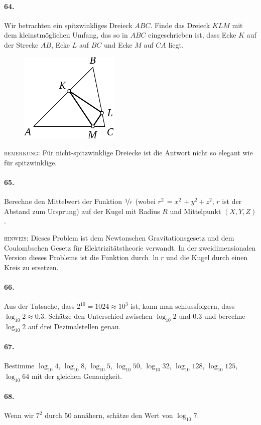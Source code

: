 \documentclass[10pt,a5paper,twoside]{article}
\newenvironment{problem}[1]{\paragraph*{#1}}{}
\begin{document}
\begin{problem}{64.}
	Wir betrachten ein spitzwinkliges Dreieck $ABC$. Finde das Dreieck $KLM$ mit dem kleinstmöglichen Umfang, das so in $ABC$ eingeschrieben ist, dass Ecke $K$ auf der Strecke $AB$, Ecke $L$ auf $BC$ und Ecke $M$ auf $CA$ liegt. 
	\begin{figure}[H]
	\centering
	\includegraphics{taskbook-48} 
	\end{figure}

	\noindent\textsc{bemerkung:} Für nicht-spitzwinklige Dreiecke ist die Antwort nicht so elegant wie für spitzwinklige.
\end{problem}

\begin{problem}{65.}
	Berechne den Mittelwert der Funktion $\nicefrac{1}{r}$ (wobei $r^2\,=x^2\,+y^2+z^2$, $r$ ist der Abstand zum Ursprung)  auf der Kugel mit Radius $R$ und Mittelpunkt $(X,Y,Z)$.

	\noindent\textsc{hinweis:} Dieses Problem ist dem Newtonschen Gravitationsgesetz und dem Coulombschen Gesetz für Elektrizitätstheorie verwandt. In der zweidimensionalen Version dieses Problems ist die Funktion durch $\ln r$ und die Kugel durch einen Kreis zu ersetzen.
\end{problem}

\begin{problem}{66.}
	Aus der Tatsache, dass $2^{10}=1024 \approx 10^3$ ist, kann man schlussfolgern, dass $\log_{10} 2 \approx 0.3$. Schätze den Unterschied zwischen $\log_{10} 2$ und $0.3$ und berechne $\log_{10} 2$ auf drei Dezimalstellen genau. 
\end{problem}

\begin{problem}{67.}
	Bestimme $\log_{10} 4$, $\log_{10} 8$, $\log_{10} 5$, $\log_{10} 50$, $\log_{10} 32$, $\log_{10} 128$, $\log_{10} 125$, $\log_{10} 64$ mit der gleichen Genauigkeit.
\end{problem}

\begin{problem}{68.}
	Wenn wir $7^2$ durch $50$ annähern, schätze den Wert von $\log_{10} 7$.
\end{problem}
\end{document}

